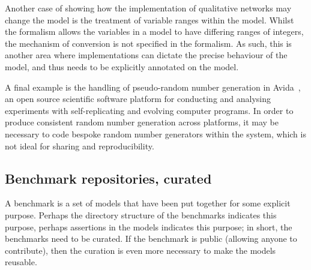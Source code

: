 \documentclass[conference]{IEEEtran}
\begin{document}
Another case of showing how the implementation of qualitative networks
may change the model is the treatment of variable ranges within the
model.  Whilst the formalism allows the variables in a model to have
differing ranges of integers, the mechanism of conversion is not
specified in the formalism. As such, this is another area where
implementations can dictate the precise behaviour of the model, and
thus needs to be explicitly annotated on the model.

A final example is the handling of pseudo-random number generation in
Avida~\cite{ofria+wilke:2004}, an open source scientific software
platform for conducting and analysing experiments with
self-replicating and evolving computer programs. In order to produce
consistent random number generation across platforms, it may be
necessary to code bespoke random number generators within the system,
which is not ideal for sharing and reproducibility.


\subsection{Benchmark repositories, curated}


A benchmark is a set of models that have been put together for some
explicit purpose. Perhaps the directory structure of the benchmarks
indicates this purpose, perhaps assertions in the models indicates
this purpose; in short, the benchmarks need to be curated. If the
benchmark is public (allowing anyone to contribute), then the curation
is even more necessary to make the models reusable.
\end{document}
